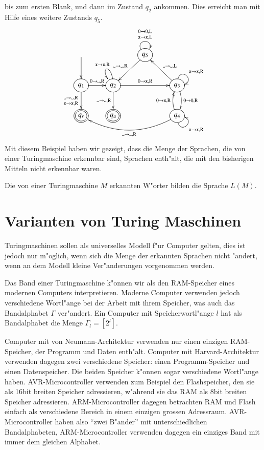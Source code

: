 bis zum ersten Blank, und dann im Zustand $q_2$ ankommen. Dies erreicht
man mit Hilfe eines weitere Zustands $q_5$.
\[
\entrymodifiers={++[o][F]}
\xymatrix{
*+\txt{}\ar[d]
	&*+\txt{}
		&{q_5}\ar@(ul,ur)^{\genfrac{}{}{0pt}{1}{0\to 0,\text{L}}{{\tt x}\to {\tt x},\text{L}}}
		      \ar[dl]_{\blank\to\blank,\text{R}}
\\
{q_1}\ar[d]_{\genfrac{}{}{0pt}{1}{\blank\to\blank,\text{R}}{{\tt x}\to{\tt x},\text{R}}}
	\ar[r]^{0\to\blank,\text{R}}
	&{q_2}\ar[d]_{\blank\to\blank,\text{R}}
	      \ar[rr]^{0\to{\tt x},\text{R}}
              \ar@(u,ul)_{{\tt x}\to {\tt x},\text{R}}
		&*+\txt{}
			&{q_3}\ar@(u,r)^{{\tt x}\to{\tt x},\text{R}}
			      \ar@/^/[d]^{0\to 0,\text{R}}
			      \ar[ul]_{\blank\to\blank,\text{L}}
\\
*++[o][F=]{q_r}
	&*++[o][F=]{q_a}
		&*+\txt{}
			&{q_4}\ar@/^/[u]^{0\to {\tt x},\text{R}}
			      \ar@(d,r)_{{\tt x}\to{\tt x},\text{R}}
			      \ar@/^20pt/[lll]^{\blank\to\blank,\text{R}}
}
\]
Mit diesem Beispiel haben wir gezeigt, dass die Menge der
Sprachen, die von einer Turingmaschine erkennbar sind, Sprachen
enth"alt, die mit den bisherigen Mitteln nicht erkennbar waren.

\begin{definition}
Die von einer Turingmaschine $M$ erkannten W"orter bilden die
Sprache $L(M)$.
\end{definition}

\section{Varianten von Turing Maschinen}
Turingmaschinen sollen als universelles Modell f"ur Computer gelten,
dies ist jedoch nur m"oglich, wenn sich die Menge der erkannten Sprachen
nicht "andert, wenn an dem Modell kleine Ver"anderungen vorgenommen
werden.

Das Band einer Turingmaschine k"onnen wir als den RAM-Speicher
eines modernen Computers interpretieren. Moderne Computer verwenden
jedoch verschiedene Wortl"ange bei der Arbeit mit ihrem Speicher,
was auch das Bandalphabet $\Gamma$ ver"andert. Ein Computer mit
Speicherwortl"ange $l$ hat als Bandalphabet die Menge $\Gamma_l=[2^l]$.

Computer mit von Neumann-Architektur verwenden nur einen einzigen RAM-Speicher,
der Programm und Daten enth"alt. Computer mit Harvard-Architektur
verwenden dagegen zwei verschiedene Speicher: einen Programm-Speicher
und einen Datenspeicher. Die beiden Speicher k"onnen sogar verschiedene
Wortl"ange haben. AVR-Microcontroller verwenden zum Beispiel
den Flashspeicher, den sie als 16bit breiten Speicher adressieren, 
w"ahrend sie das RAM als 8bit breiten Speicher adressieren.
ARM-Microcontroller dagegen betrachten RAM und Flash einfach als
verschiedene Bereich in einem einzigen grossen Adressraum.
AVR-Microcontroller haben also ``zwei B"ander'' mit unterschiedlichen
Bandalphabeten, ARM-Microcontroller verwenden dagegen ein einziges Band
mit immer dem gleichen Alphabet.


